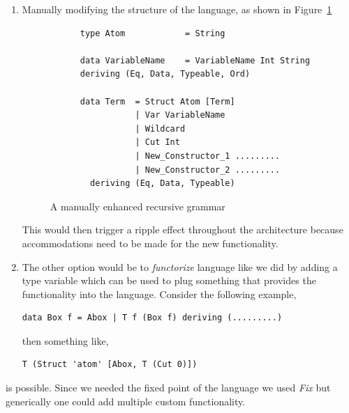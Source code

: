 \documentclass[thesis-solanki.tex]{subfiles}
\begin{document}
\begin{enumerate}
\item Manually modifying the structure of the language, as shown in Figure~\ref{tab:man-enhan-gram}
  \begin{figure}
    \begin{verbatim}
      type Atom            = String

      data VariableName    = VariableName Int String
      deriving (Eq, Data, Typeable, Ord)

      data Term  = Struct Atom [Term]
                 | Var VariableName
                 | Wildcard
                 | Cut Int
                 | New_Constructor_1 .........
                 | New_Constructor_2 .........
        deriving (Eq, Data, Typeable)
    \end{verbatim}
    \caption{A manually enhanced recursive grammar}
    \label{tab:man-enhan-gram}
  \end{figure}

This would then trigger a ripple effect throughout the architecture because accommodations need to be made for the new functionality.

\item The other option would be to \textit{functorize} language like we did by adding a type variable which can be used to plug something that provides the functionality into the language.
Consider the following example,

\begin{verbatim}
data Box f = Abox | T f (Box f) deriving (.........)
\end{verbatim}

then something like,
\begin{verbatim}
T (Struct 'atom' [Abox, T (Cut 0)])
\end{verbatim}
\end{enumerate}
is possible. Since we needed the fixed point of the language we used \textit{Fix} but generically one could add multiple custom
functionality.
\end{document}
